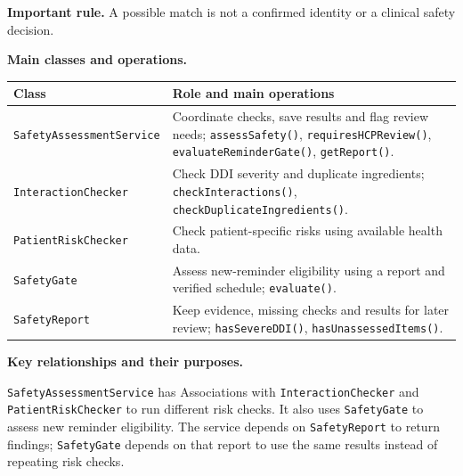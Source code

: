 \documentclass[10pt,letterpaper]{article}
\begin{document}
\noindent\textbf{Important rule.} A possible match is not a confirmed identity
or a clinical safety decision.



\noindent\textbf{Main classes and operations.}\par\smallskip
\begingroup\small
\begin{tabularx}{\textwidth}{|L{0.37\textwidth}|Y|}
\hline
\textbf{Class} & \textbf{Role and main operations} \\ \hline

\texttt{SafetyAssessmentService} &
Coordinate checks, save results and flag review needs;
\texttt{assessSafety()}, \texttt{requiresHCPReview()},
\texttt{evaluateReminderGate()}, \texttt{getReport()}. \\ \hline

\texttt{InteractionChecker} &
Check DDI severity and duplicate ingredients;
\texttt{checkInteractions()},
\texttt{checkDuplicateIngredients()}. \\ \hline

\texttt{PatientRiskChecker} &
Check patient-specific risks using available health data. \\ \hline

\texttt{SafetyGate} &
Assess new-reminder eligibility using a report and verified
schedule; \texttt{evaluate()}. \\ \hline

\texttt{SafetyReport} &
Keep evidence, missing checks and results for later review; \texttt{hasSevereDDI()},
\texttt{hasUnassessedItems()}. \\ \hline

\end{tabularx}
\endgroup

\noindent\textbf{Key relationships and their purposes.}\par\smallskip
\texttt{SafetyAssessmentService} has Associations with
\texttt{InteractionChecker} and \texttt{PatientRiskChecker} to run
different risk checks. It also uses \texttt{SafetyGate} to assess new
reminder eligibility. The service depends on \texttt{SafetyReport} to
return findings; \texttt{SafetyGate} depends on that report to use the
same results instead of repeating risk checks.
\end{document}
